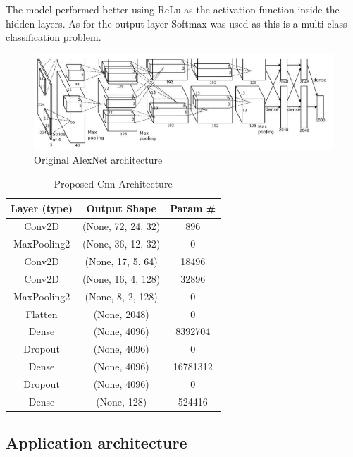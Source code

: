 The model performed better using ReLu as the activation function inside the hidden layers. As for the output layer Softmax was used as this is a multi class classification problem.


\begin{figure}[H]
	\caption[AlexNet Architecture]{ Original AlexNet architecture \cite{alexnet}}
	\centering
	\label{fig:alexnet}
	\includegraphics[width=1\textwidth, height=\textheight, keepaspectratio]{"resources/alexnet"}
\end{figure}

\begin{table} [H]
	\centering
	\caption{Proposed Cnn Architecture}
	\begin{tabular}{ |c|c|c|} 
		\hline
		Layer (type) & Output Shape & Param \# \\ \hline
		Conv2D &  (None, 72, 24, 32) & 896 \\ \hline
		MaxPooling2 & (None, 36, 12, 32) & 0\\ \hline
		Conv2D & (None, 17, 5, 64) & 18496 \\ \hline
		Conv2D & (None, 16, 4, 128) & 32896 \\ \hline
		MaxPooling2 & (None, 8, 2, 128) & 0 \\ \hline
		Flatten & (None, 2048) & 0 \\ \hline
		Dense & (None, 4096) & 8392704 \\ \hline
		Dropout & (None, 4096) & 0 \\ \hline
		Dense & (None, 4096) & 16781312 \\ \hline
		Dropout & (None, 4096) & 0 \\ \hline
		Dense & (None, 128) & 524416 \\ \hline						
	\end{tabular}
	\label{table:cnn_architecture}
\end{table}
\newpage

\subsection{Application architecture}

